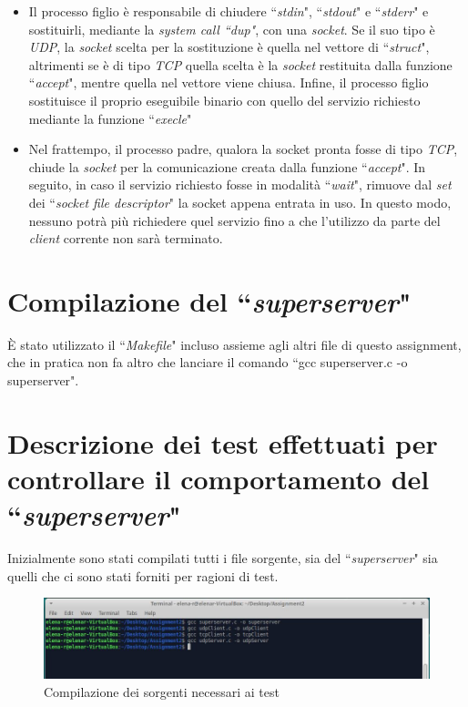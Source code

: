 \documentclass[a4paper, 12pt]{report}
\begin{document}
\begin{itemize}
    \item Il processo figlio è responsabile di chiudere ``\textit{stdin}", ``\textit{stdout}" e ``\textit{stderr}" e sostituirli, mediante la \textit{system call ``dup"},
    con una \textit{socket}. Se il suo tipo è \textit{UDP}, la \textit{socket} scelta per la sostituzione è quella nel vettore di ``\textit{struct}", altrimenti se è di tipo \textit{TCP}
    quella scelta è la \textit{socket} restituita dalla funzione ``\textit{accept}", mentre quella nel vettore viene chiusa. Infine, il processo figlio sostituisce il proprio
    eseguibile binario con quello del servizio richiesto mediante la funzione ``\textit{execle}"
    \item Nel frattempo, il processo padre, qualora la socket pronta fosse di tipo \textit{TCP}, chiude la \textit{socket} per la comunicazione creata dalla funzione ``\textit{accept}".
    In seguito, in caso il servizio richiesto fosse in modalità ``\textit{wait}", rimuove dal \textit{set} dei ``\textit{socket file descriptor}" la socket appena entrata in
    uso. In questo modo, nessuno potrà più richiedere quel servizio fino a che l'utilizzo da parte del \textit{client} corrente non sarà terminato. 
\end{itemize}

\section{Compilazione del ``\textit{superserver}"}

È stato utilizzato il ``\textit{Makefile}" incluso assieme agli altri file di questo assignment, che in pratica non fa altro che lanciare il comando ``gcc superserver.c
-o superserver".

\section{Descrizione dei test effettuati per controllare il comportamento del ``\textit{superserver}"}

Inizialmente sono stati compilati tutti i file sorgente, sia del ``\textit{superserver}" sia quelli che ci sono stati forniti per ragioni di test.

\begin{figure}[H]
	\centering
	\includegraphics[width=\linewidth]{images/gcc.JPG}
	\caption{Compilazione dei sorgenti necessari ai test}
\end{figure}
\end{document}
